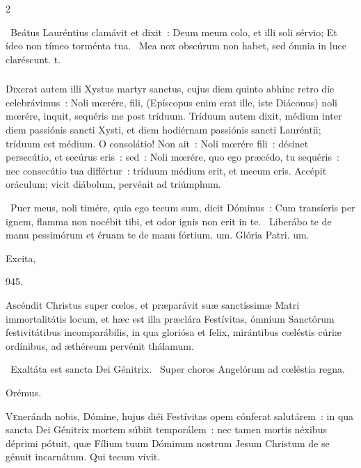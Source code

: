 \documentclass[9pt,twoside]{extarticle}
\begin{document}
\begin{multicols}{2}
\begin{tightlist}{}
\item {}~Beátus Lauréntius clamávit et dixit~: Deum meum colo, et illi soli sérvio; \textred{*} Et ídeo non tímeo torménta tua.
~Mea nox obscúrum non habet, sed ómnia in luce claréscunt. t.
\end{tightlist}

\subsubsection*{\center {}}
\lettrine{D}ixerat autem illi Xystus martyr sanctus, cujus diem quinto abhinc retro die celebrávimus~: Noli mœrére, fili, (Epíscopus enim erat ille, iste Diáconus) noli mœrére, inquit, sequéris me post tríduum. Tríduum autem dixit, médium inter diem passiónis sancti Xysti, et diem hodiérnam passiónis sancti Lauréntii; tríduum est médium. O consolátio! Non ait~: Noli mœrére fili~: désinet persecútio, et secúrus eris~: sed~: Noli mœrére, quo ego præcédo, tu sequéris~: nec consecútio tua différtur~: tríduum médium erit, et mecum eris. Accépit oráculum; vicit diábolum, pervénit ad triúmphum.

\begin{tightlist}{}
\item {}~Puer meus, noli timére, quia ego tecum sum, dicit Dóminus~: \textred{*} Cum transíeris per ignem, flamma non nocébit tibi, et odor ignis non erit in te.
~Liberábo te de manu pessimórum et éruam te de manu fórtium. um. Glória Patri. um.
\item {}
\item {} Excita, 
\item {} 945.
\item {} Ascéndit Christus super cœlos, et præparávit suæ sanctíssimæ Matri immortalitátis locum, et hæc est illa præclára Festívitas, ómnium Sanctórum festivitátibus incomparábilis, in qua gloriósa et felix, mirántibus cœléstis cúriæ ordínibus, ad æthéreum pervénit thálamum.
\item {}~Exaltáta est sancta Dei Génitrix. ~Super choros Angelórum ad cœléstia regna.
\item Orémus. \hfill {}
\end{tightlist}
\lettrine{V}eneránda nobis, Dómine, hujus diéi Festívitas opem cónferat salutárem~: in qua sancta Dei Génitrix mortem súbiit temporálem~: nec tamen mortis néxibus déprimi pótuit, quæ Fílium tuum Dóminum nostrum Jesum Christum de se génuit incarnátum. Qui tecum vivit.


\end{multicols}
\end{document}
